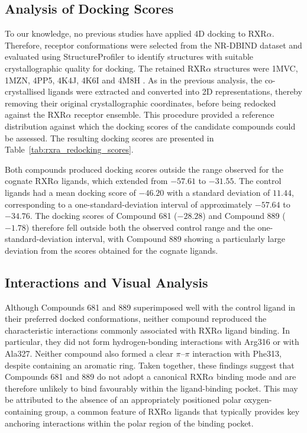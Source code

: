 \subsection{Analysis of Docking Scores}
To our knowledge, no previous studies have applied 4D docking to RXR$\alpha$. Therefore, receptor conformations were selected from the NR-DBIND dataset \cite{reau2018nuclear} and evaluated using StructureProfiler \cite{meyder2019structureprofiler,schoning2020proteins} to identify structures with suitable crystallographic quality for docking. The retained RXR$\alpha$ structures were 1MVC, 1MZN, 4PP5, 4K4J, 4K6I and 4M8H \cite{atigadda2014methyl,egea2002molecular,boerma2014defining}. As in the previous analysis, the co-crystallised ligands were extracted and converted into 2D representations, thereby removing their original crystallographic coordinates, before being redocked against the RXR$\alpha$ receptor ensemble. This procedure provided a reference distribution against which the docking scores of the candidate compounds could be assessed. The resulting docking scores are presented in Table~\ref{tab:rxra_redocking_scores}.





Both compounds produced docking scores outside the range observed for the cognate RXR$\alpha$ ligands, which extended from $-57.61$ to $-31.55$. The control ligands had a mean docking score of $-46.20$ with a standard deviation of $11.44$, corresponding to a one-standard-deviation interval of approximately $-57.64$ to $-34.76$. The docking scores of Compound 681 ($-28.28$) and Compound 889 ($-1.78$) therefore fell outside both the observed control range and the one-standard-deviation interval, with Compound 889 showing a particularly large deviation from the scores obtained for the cognate ligands. 


\subsection{Interactions and Visual Analysis}
Although Compounds 681 and 889 superimposed well with the control ligand in their preferred docked conformations, neither compound reproduced the characteristic interactions commonly associated with RXR$\alpha$ ligand binding. In particular, they did not form hydrogen-bonding interactions with Arg316 or with Ala327. Neither compound also formed a clear $\pi$--$\pi$ interaction with Phe313, despite containing an aromatic ring. Taken together, these findings suggest that Compounds 681 and 889 do not adopt a canonical RXR$\alpha$ binding mode and are therefore unlikely to bind favourably within the ligand-binding pocket. This may be attributed to the absence of an appropriately positioned polar oxygen-containing group, a common feature of RXR$\alpha$ ligands that typically provides key anchoring interactions within the polar region of the binding pocket.

